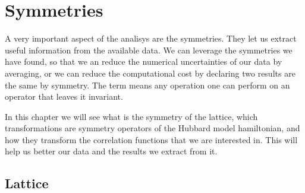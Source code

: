 
\chapter{Symmetries}
\label{sec:symmetries}

A very important aspect of the analisys are the symmetries. They let us extract useful information from the available data. We can leverage the symmetries we have found, so that we an reduce the numerical uncertainties of our data by averaging, or we can reduce the computational cost by declaring two results are the same by symmetry. The term means any operation one can perform on an operator that leaves it invariant.

In this chapter we will see what is the symmetry of the lattice, which transformations are symmetry operators of the Hubbard model hamiltonian, and how they transform the correlation functions that we are interested in. This will help us better our data and the results we extract from it.

\section{Lattice}

